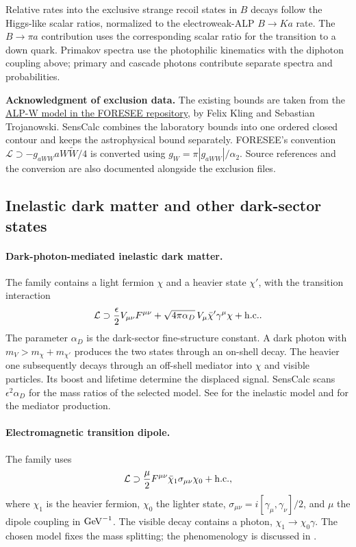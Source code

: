 Relative rates into the exclusive strange recoil states in $B$ decays follow the Higgs-like scalar ratios, normalized to the electroweak-ALP $B\to Ka$ rate. The $B\to\pi a$ contribution uses the corresponding scalar ratio for the transition to a down quark. Primakov spectra use the photophilic kinematics with the diphoton coupling above; primary and cascade photons contribute separate spectra and probabilities.

\textbf{Acknowledgment of exclusion data.} The existing bounds are taken from the \href{https://github.com/KlingFelix/FORESEE/tree/main/Models/ALP-W}{ALP-W model in the FORESEE repository}, by Felix Kling and Sebastian Trojanowski. SensCalc combines the laboratory bounds into one ordered closed contour and keeps the astrophysical bound separately. FORESEE's convention $\mathcal L\supset-g_{aWW}aW\widetilde W/4$ is converted using $g_W=\pi|g_{aWW}|/\alpha_2$. Source references and the conversion are also documented alongside the exclusion files.

\subsection{Inelastic dark matter and other dark-sector states}
\paragraph{Dark-photon-mediated inelastic dark matter.}
The  family contains a light fermion $\chi$ and a heavier state $\chi'$, with the transition interaction
\begin{equation}
 \mathcal L\supset\frac{\epsilon}{2}V_{\mu\nu}F^{\mu\nu}
 +\sqrt{4\pi\alpha_D}\,V_\mu\bar\chi'\gamma^\mu\chi+\mathrm{h.c.}.
\end{equation}
The parameter $\alpha_D$ is the dark-sector fine-structure constant. A dark photon with $m_V>m_\chi+m_{\chi'}$ produces the two states through an on-shell decay. The heavier one subsequently decays through an off-shell mediator into $\chi$ and visible particles. Its boost and lifetime determine the displaced signal. SensCalc scans $\epsilon^2\alpha_D$ for the mass ratios of the selected model. See  for the inelastic model and  for the mediator production.

\paragraph{Electromagnetic transition dipole.}
The  family uses
\begin{equation}
 \mathcal L\supset\frac{\mu}{2}F^{\mu\nu}\bar\chi_1\sigma_{\mu\nu}\chi_0+\mathrm{h.c.},
\end{equation}
where $\chi_1$ is the heavier fermion, $\chi_0$ the lighter state, $\sigma_{\mu\nu}=i[\gamma_\mu,\gamma_\nu]/2$, and $\mu$ the dipole coupling in $\mathrm{GeV}^{-1}$. The visible decay contains a photon, $\chi_1\to\chi_0\gamma$. The chosen model fixes the mass splitting; the phenomenology is discussed in .

